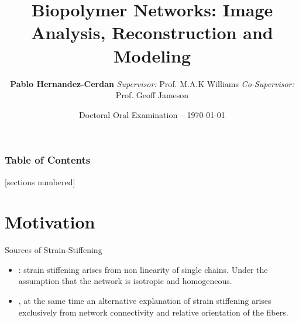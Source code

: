 \documentclass[9pt]{beamer}
\title{Biopolymer Networks: Image Analysis, Reconstruction and Modeling}
\author{{\Large\textbf{Pablo Hernandez-Cerdan}}
  \emph{\newline \textit{Supervisor}:} Prof. M.A.K Williams%
  \emph{\newline \textit{Co-Supervisor}:} Prof. Geoff Jameson%
}
\date{Doctoral Oral Examination -- \today}
\begin{document}
\maketitle

\begin{frame}
  \frametitle{Table of Contents}
  [sections numbered]
  \tableofcontents[hideallsubsections]
\end{frame}

\section{Motivation}
\begin{frame}{Sources of Strain-Stiffening}
  \begin{itemize}
    \item \citep{storm_nonlinear_2005}: strain stiffening arises from non linearity of single chains.
      Under the assumption that the network is isotropic and homogeneous.
    \item \citep{onck_alternative_2005}, at the same time an alternative explanation of strain stiffening arises exclusively from
      network connectivity and relative orientation of the fibers.
  \end{itemize}
\end{frame}
\end{document}
